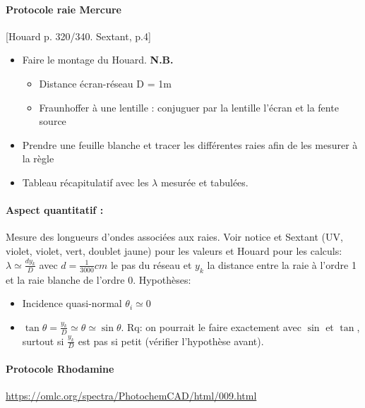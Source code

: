 \documentclass[11pt]{report}
\numberwithin{figure}{section}
\numberwithin{equation}{section}
\numberwithin{table}{section}
\newcommand{\1}{\boldsymbol{1}}
\begin{document}
\begin{tcolorbox}[breakable, enhanced, colback=red!2!white,colframe=mycolor!85!black,title=\textbf{\textbf{Expérience}}]
\paragraph{Protocole raie Mercure} [Houard p. 320/340. Sextant, p.4]
\begin{itemize}
		\item Faire le montage du Houard. \textbf{N.B.}
		\begin{itemize}
		\item Distance écran-réseau D = 1m
		\item Fraunhoffer à une lentille : conjuguer par la lentille l'écran et la fente source
		\end{itemize}
		\item Prendre une feuille blanche et tracer les différentes raies afin de les mesurer à la règle
		\item Tableau récapitulatif avec les $\lambda$ mesurée et tabulées.
\end{itemize}

\paragraph*{Aspect quantitatif :} Mesure des longueurs d'ondes associées aux raies. Voir notice et Sextant (UV, violet, violet, vert, doublet jaune) pour les valeurs et Houard pour les calculs: $\lambda \simeq \frac{d y_k}{D}$ avec $d = \frac{1}{3000} cm$ le pas du réseau et $y_k$ la distance entre la raie à l'ordre 1 et la raie blanche de l'ordre 0. Hypothèses:
\begin{itemize}
\item Incidence quasi-normal $\theta_ i \simeq 0$
\item $\tan \theta = \frac{y_k}{D} \simeq \theta  \simeq \sin \theta$. Rq: on pourrait le faire exactement avec $\sin$ et $\tan$, surtout si $\frac{y_k}{D}$ est pas si petit (vérifier l'hypothèse avant). 
\end{itemize}




\paragraph*{Protocole Rhodamine} 

\url{https://omlc.org/spectra/PhotochemCAD/html/009.html}


\end{tcolorbox}
\end{document}
